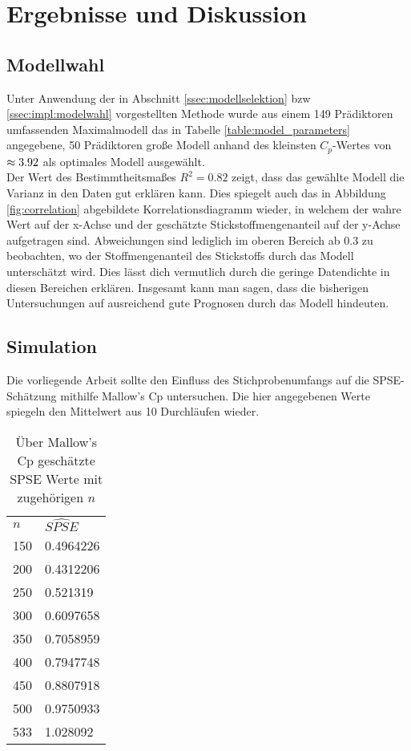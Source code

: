 \section{Ergebnisse und Diskussion}
\label{sec:discuss}

\subsection{Modellwahl}
\label{ssec:discuss:modelselect}
Unter Anwendung der in Abschnitt \ref{ssec:modellselektion} bzw \ref{ssec:impl:modelwahl} vorgestellten Methode wurde aus einem 149 Prädiktoren umfassenden Maximalmodell das in Tabelle \ref{table:model_parameters} angegebene, 50 Prädiktoren große Modell anhand des kleinsten $C_p$-Wertes von $\mathrm{\approx3.92}$ als optimales Modell ausgewählt.\\

Der Wert des Bestimmtheitsmaßes $R^2 = 0.82$ zeigt, dass das gewählte Modell die Varianz in den Daten gut erklären kann. Dies spiegelt auch das in Abbildung \ref{fig:correlation} abgebildete Korrelationsdiagramm wieder, in welchem der wahre Wert auf der x-Achse und der geschätzte Stickstoffmengenanteil auf der y-Achse aufgetragen sind.
Abweichungen sind lediglich im oberen Bereich ab $0.3$ zu beobachten, wo der Stoffmengenanteil des Stickstoffs durch das Modell unterschätzt wird.
Dies lässt dich vermutlich durch die geringe Datendichte in diesen Bereichen erklären.
Insgesamt kann man sagen, dass die bisherigen Untersuchungen auf ausreichend gute Prognosen durch das Modell hindeuten.



\subsection{Simulation}
\label{ssec:discuss:simulation}
Die vorliegende Arbeit sollte den Einfluss des Stichprobenumfangs auf die SPSE-Schätzung mithilfe Mallow's Cp untersuchen. Die hier angegebenen Werte spiegeln den Mittelwert aus 10 Durchläufen wieder.

\begin{table}[]
	\caption{Über Mallow's Cp geschätzte SPSE Werte mit zugehörigen $n$}
	\begin{tabular}{|l|l|}
		\cline{1-2}
		$n$   & $\hat{SPSE}$ \\ 		\cline{1-2}
		150 &  0.4964226   \\ \cline{1-2}
		200 &  0.4312206   \\ \cline{1-2}
		250 &  0.521319    \\ \cline{1-2}
		300 &  0.6097658  \\ \cline{1-2}
		350 &  0.7058959   \\ \cline{1-2}
		400 &  0.7947748 \\ \cline{1-2}
		450 &  0.8807918  \\ \cline{1-2}
		500 &  0.9750933   \\ \cline{1-2}
		533 &  1.028092   \\ \cline{1-2}

						\end{tabular}
\end{table}

